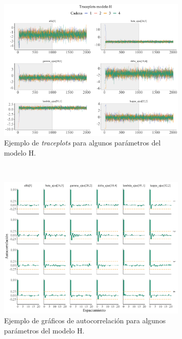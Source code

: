 \begin{figure}
	\centering
	\begin{subfigure}{0.4\textwidth}
	\includegraphics[width = \textwidth]{Figs/Convergencia/Convergencia_Traceplots}
	\caption{Ejemplo de \textit{traceplots} para algunos parámetros del modelo H.}
	\label{fig:Traceplots_H}
	\end{subfigure}
	~
	\begin{subfigure}{0.4\textwidth}
	\includegraphics[width = \textwidth]{Figs/Convergencia/Convergencia_AutoCorr}
	\caption{Ejemplo de gráficos de autocorrelación para algunos parámetros del modelo H.}
	\label{fig:Autocorr_H}
	\end{subfigure}
	~
	\begin{subfigure}{0.4\textwidth}

\end{subfigure}
\end{figure}
